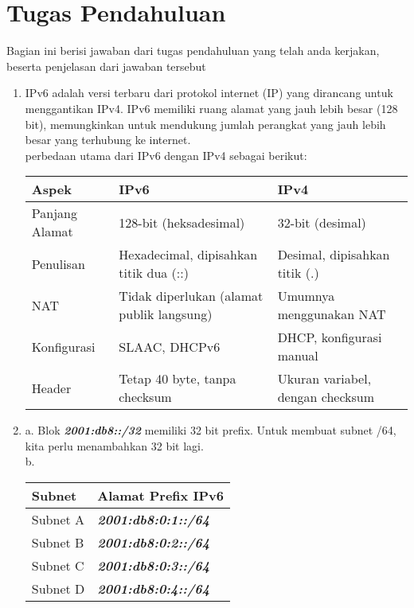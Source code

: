 \section{Tugas Pendahuluan}
Bagian ini berisi jawaban dari tugas pendahuluan yang telah anda kerjakan, beserta penjelasan dari jawaban tersebut
\begin{enumerate}
	\item IPv6 adalah versi terbaru dari protokol internet (IP) yang dirancang untuk menggantikan IPv4. IPv6 memiliki ruang alamat yang jauh lebih besar (128 bit), memungkinkan untuk mendukung jumlah perangkat yang jauh lebih besar yang terhubung ke internet.\\
	perbedaan utama dari IPv6 dengan IPv4 sebagai berikut:\\
	\begin{table}[h!]
		\centering
		\begin{tabular}{|l|l|l|}
		\hline
		\textbf{Aspek} & \textbf{IPv6} & \textbf{IPv4} \\ \hline
		Panjang Alamat                  & 128-bit (heksadesimal)                      & 32-bit (desimal)                    \\ \hline
		Penulisan                       & Hexadecimal, dipisahkan titik dua (::)      & Desimal, dipisahkan titik (.)       \\ \hline
		NAT                             & Tidak diperlukan (alamat publik langsung)   & Umumnya menggunakan NAT             \\ \hline
		Konfigurasi                     & SLAAC, DHCPv6                               & DHCP, konfigurasi manual            \\ \hline
		Header                          & Tetap 40 byte, tanpa checksum               & Ukuran variabel, dengan checksum    \\ \hline
		\end{tabular}
	\end{table}

	\item a. Blok \textbf{\textit{2001:db8::/32}}	memiliki 32 bit prefix. Untuk membuat subnet /64, kita perlu menambahkan 32 bit lagi.\\
	b.\\
	\begin{table}[h!]
		\centering
		\begin{tabular}{|l|l|}
		\hline
		\textbf{Subnet} & \textbf{Alamat Prefix IPv6} \\ \hline
		Subnet A & \textbf{\textit{2001:db8:0:1::/64}}\\ \hline
		Subnet B & \textbf{\textit{2001:db8:0:2::/64}} \\ \hline
		Subnet C & \textbf{\textit{2001:db8:0:3::/64}} \\ \hline
		Subnet D & \textbf{\textit{2001:db8:0:4::/64}} \\ \hline
		\end{tabular}
	\end{table}
	\\\\\\
	

\end{enumerate}
